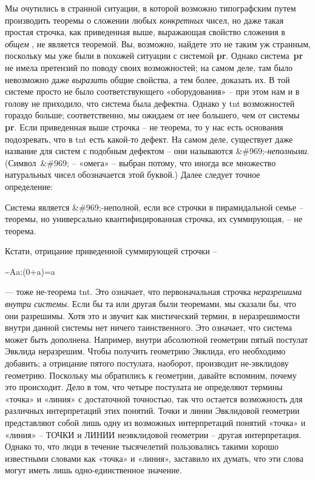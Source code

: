 \documentclass[../main.tex]{subfiles}
\begin{document}
Мы очутились в странной ситуации, в которой возможно типографским путем производить теоремы о сложении любых \emph{конкретных} чисел, но даже такая простая строчка, как приведенная выше, выражающая свойство сложения в \emph{общем} , не является теоремой. Вы, возможно, найдете это не таким уж странным, поскольку мы уже были в похожей ситуации с системой \textbf{pr}. Однако система~\textbf{pr} не имела претензий по поводу своих возможностей; на самом деле, там было невозможно даже \emph{выразить} общие свойства, а тем более, доказать их. В той системе просто не было соответствующего «оборудования» \--- при этом нам и в голову не приходило, что система была дефектна. Однако у \acs{tnt} возможностей гораздо больше; соответственно, мы ожидаем от нее большего, чем от системы \textbf{pr}. Если приведенная выше строчка \--- не теорема, то у нас есть основания подозревать, что в \acs{tnt} есть какой-то дефект. На самом деле, существует даже название для систем с подобным дефектом \--- они называются \&\#969;-\emph{неполными}. (Символ~\&\#969; \--- «омега» \--- выбран потому, что иногда все множество натуральных чисел обозначается этой буквой.) Далее следует точное определение:

Система является \&\#969;-неполной, если все строчки в пирамидальной семье \--- теоремы, но универсально квантифицированная строчка, их суммирующая, \--- не теорема.

Кстати, отрицание приведенной суммирующей строчки \---

\textasciitilde Aa:(0+a)=a

--- тоже не-теорема \acs{tnt}. Это означает, что первоначальная строчка \emph{неразрешима внутри системы}. Если бы та или другая были теоремами, мы сказали бы, что они разрешимы. Хотя это и звучит как мистический термин, в неразрешимости внутри данной системы нет ничего таинственного. Это означает, что система может быть дополнена. Например, внутри абсолютной геометрии пятый постулат Эвклида неразрешим. Чтобы получить геометрию Эвклида, его необходимо добавить; а отрицание пятого постулата, наоборот, производит не-эвклидову геометрию. Поскольку мы обратились к геометрии, давайте вспомним, почему это происходит. Дело в том, что четыре постулата не определяют термины «точка» и «линия» с достаточной точностью, так что остается возможность для различных интерпретаций этих понятий. Точки и линии Эвклидовой геометрии представляют собой лишь одну из возможных интерпретаций понятий «точка» и «линия» \--- ТОЧКИ и ЛИНИИ неэвклидовой геометрии \--- другая интерпретация. Однако то, что люди в течение тысячелетий пользовались такими хорошо известными словами как «точка» и «линия», заставило их думать, что эти слова могут иметь лишь одно-единственное значение.
\end{document}
